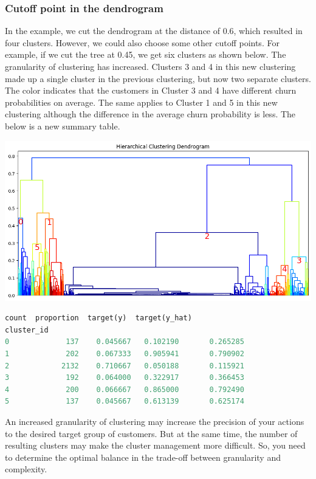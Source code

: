 \documentclass{article}
\begin{document}
\subsubsection{Cutoff point in the dendrogram}
In the example, we cut the dendrogram at the distance of 0.6, which resulted in four clusters. However, we could also choose some other cutoff points. For example, if we cut the tree at 0.45, we get six clusters as shown below. The granularity of clustering has increased. Clusters 3 and 4 in this new clustering made up a single cluster in the previous clustering, but now two separate clusters. The color indicates that the customers in Cluster 3 and 4 have different churn probabilities on average. The same applies to Cluster 1 and 5 in this new clustering although the difference in the average churn probability is less. The below is a new summary table.

\includegraphics[width=1\textwidth]{dendrogram_depth3_colored_thres045}

\begin{lstlisting}[language=Python,numbers=none]
            count  proportion  target(y)  target(y_hat)
cluster_id                                             
0             137    0.045667   0.102190       0.265285
1             202    0.067333   0.905941       0.790902
2            2132    0.710667   0.050188       0.115921
3             192    0.064000   0.322917       0.366453
4             200    0.066667   0.865000       0.792490
5             137    0.045667   0.613139       0.625174
\end{lstlisting}

An increased granularity of clustering may increase the precision of your actions to the desired target group of customers. But at the same time, the number of resulting clusters may make the cluster management more difficult. So, you need to determine the optimal balance in the trade-off between granularity and complexity.
\end{document}
